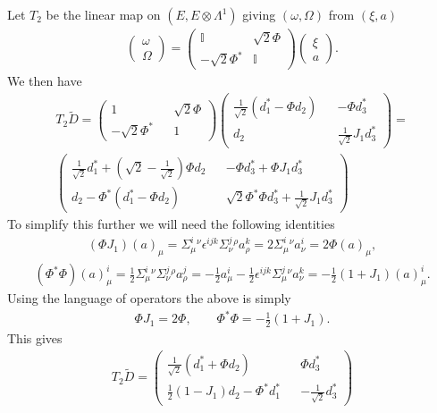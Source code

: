 \documentclass[10pt]{report}
\theoremstyle{definition}
\begin{document}
Let $T_2$ be the linear map on $(E,E\otimes\Lambda^1)$ giving $(\omega,\Omega)$ from $(\xi,a)$
\begin{align}
\left( \begin{array}{c} \omega \\ \Omega \end{array}\right) = \left( \begin{array}{cc} \mathbb{I} & \sqrt{2}\Phi \\ - \sqrt{2} \Phi^* & \mathbb{I}\end{array}\right) \left( \begin{array}{c} \xi \\ a \end{array}\right).
\end{align}
We then have
\begin{align}
T_2 \tilde{D} = \begin{pmatrix} 1 && \sqrt{2} \Phi \\ - \sqrt{2} \Phi^* && 1 \end{pmatrix} \begin{pmatrix} \frac{1}{\sqrt{2}}(d_1^* - \Phi d_2) && - \Phi d_3^* \\ d_2 && \frac{1}{\sqrt{2}} J_1 d_3^* \end{pmatrix} =\\ \nonumber \begin{pmatrix} \frac{1}{\sqrt{2}} d_1^* + (\sqrt{2}-\frac{1}{\sqrt{2}})  \Phi d_2  && - \Phi d_3^* + \Phi J_1 d_3^* \\ d_2 - \Phi^*(d_1^* - \Phi d_2) && \sqrt{2} \Phi^* \Phi d_3^* + \frac{1}{\sqrt{2}} J_1 d_3^* \end{pmatrix}
\end{align}
To simplify this further we will need the following identities 
\begin{align}
(\Phi J_1)(a)_\mu = \Sigma^i_\mu{}^\nu \epsilon^{ijk} \Sigma^j_\nu{}^\rho a^k_\rho = 2 \Sigma^i_\mu{}^\nu a^i_\nu = 2 \Phi(a)_\mu,
\end{align}
\begin{align}
(\Phi^* \Phi)(a)^i_\mu = \frac{1}{2} \Sigma^i_\mu{}^\nu \Sigma^j_\nu{}^\rho a^j_\rho = -\frac{1}{2} a^i_\mu - \frac{1}{2} \epsilon^{ijk}\Sigma^j_\mu{}^\nu a^k_\nu = -\frac{1}{2}(1+J_1)(a)^i_\mu.
\end{align}
Using the language of operators the above is simply 
\begin{align}
\Phi J_1 = 2 \Phi, \qquad \Phi^* \Phi = -\frac{1}{2}(1+J_1).
\end{align}
This gives
\begin{align}
T_2 \tilde{D} =\begin{pmatrix} \frac{1}{\sqrt{2}} (d_1^* +  \Phi d_2)  &&  \Phi d_3^*  \\ \frac{1}{2}(1-J_1) d_2 - \Phi^*d_1^*  &&- \frac{1}{\sqrt{2}}  d_3^* \end{pmatrix}
\end{align}
\end{document}
